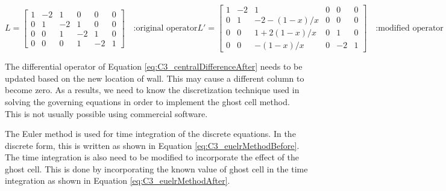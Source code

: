 \begin{subequations}
\begin{equation}\label{eq:C3_centralDifferenceBefore}
	L = 
	\begin{bmatrix}
	1 & -2 & 1 & 0 & 0 & 0 \\
	0 & 1 & -2 & 1 & 0 & 0 \\
	0 & 0 & 1 & -2 & 1 & 0 \\
	0 & 0 & 0 & 1 & -2 & 1
	\end{bmatrix} \quad \text{:original operator}
\end{equation}
\begin{equation}\label{eq:C3_centralDifferenceAfter}
	L' = 
	\begin{bmatrix}
	1 & -2 & 1 & 0 & 0 & 0 \\
	0 & 1 & -2-(1-x)/x & 0 & 0 & 0 \\
	0 & 0 & 1+2(1-x)/x & 0 & 1 & 0 \\
	0 & 0 & -(1-x)/x & 0 & -2 & 1
	\end{bmatrix} \quad \text{:modified operator}
\end{equation}
\end{subequations}

The differential operator of Equation \eqref{eq:C3_centralDifferenceAfter} needs to be updated based on the new location of wall. This may cause a different column to become zero. As a results, we need to know the discretization technique used in solving the governing equations in order to implement the ghost cell method. This is not usually possible using commercial software.

The Euler method is used for time integration of the discrete equations. In the discrete form, this is written as shown in Equation \eqref{eq:C3_euelrMethodBefore}. The time integration is also need to be modified to incorporate the effect of the ghost cell. This is done by incorporating the known value of ghost cell in the time integration as shown in Equation \eqref{eq:C3_euelrMethodAfter}.

